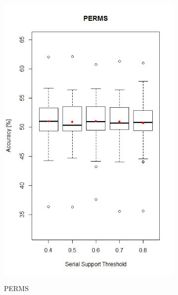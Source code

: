 \begin{figure}[h]
\centering
\begin{subfigure}{.5\textwidth}
  \centering
  \includegraphics[width=\linewidth]{permsSupportSerial}
  \label{fig_permsSupportSerial}
  \caption{PERMS}
\end{subfigure}%
\begin{subfigure}{.5\textwidth}
  \centering

\end{subfigure}
\end{figure}
